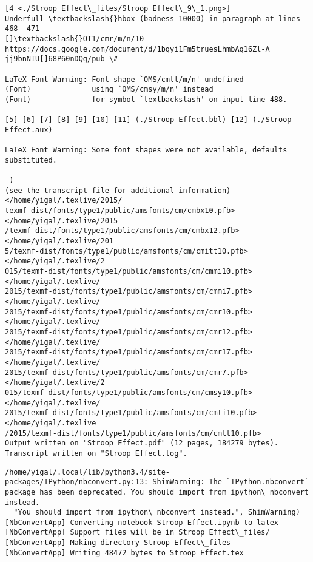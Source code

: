 \documentclass{article}
\begin{document}
\begin{Verbatim}[commandchars=\\\{\}]
[4 <./Stroop Effect\_files/Stroop Effect\_9\_1.png>]
Underfull \textbackslash{}hbox (badness 10000) in paragraph at lines 468--471
[]\textbackslash{}OT1/cmr/m/n/10 https://docs.google.com/document/d/1bqyi1Fm5truesLhmbAq16Zl-A
jj9bnNIU[]68P60nDQg/pub \#

LaTeX Font Warning: Font shape `OMS/cmtt/m/n' undefined
(Font)              using `OMS/cmsy/m/n' instead
(Font)              for symbol `textbackslash' on input line 488.

[5] [6] [7] [8] [9] [10] [11] (./Stroop Effect.bbl) [12] (./Stroop Effect.aux)

LaTeX Font Warning: Some font shapes were not available, defaults substituted.

 )
(see the transcript file for additional information)</home/yigal/.texlive/2015/
texmf-dist/fonts/type1/public/amsfonts/cm/cmbx10.pfb></home/yigal/.texlive/2015
/texmf-dist/fonts/type1/public/amsfonts/cm/cmbx12.pfb></home/yigal/.texlive/201
5/texmf-dist/fonts/type1/public/amsfonts/cm/cmitt10.pfb></home/yigal/.texlive/2
015/texmf-dist/fonts/type1/public/amsfonts/cm/cmmi10.pfb></home/yigal/.texlive/
2015/texmf-dist/fonts/type1/public/amsfonts/cm/cmmi7.pfb></home/yigal/.texlive/
2015/texmf-dist/fonts/type1/public/amsfonts/cm/cmr10.pfb></home/yigal/.texlive/
2015/texmf-dist/fonts/type1/public/amsfonts/cm/cmr12.pfb></home/yigal/.texlive/
2015/texmf-dist/fonts/type1/public/amsfonts/cm/cmr17.pfb></home/yigal/.texlive/
2015/texmf-dist/fonts/type1/public/amsfonts/cm/cmr7.pfb></home/yigal/.texlive/2
015/texmf-dist/fonts/type1/public/amsfonts/cm/cmsy10.pfb></home/yigal/.texlive/
2015/texmf-dist/fonts/type1/public/amsfonts/cm/cmti10.pfb></home/yigal/.texlive
/2015/texmf-dist/fonts/type1/public/amsfonts/cm/cmtt10.pfb>
Output written on "Stroop Effect.pdf" (12 pages, 184279 bytes).
Transcript written on "Stroop Effect.log".
    \end{Verbatim}

    \begin{Verbatim}[commandchars=\\\{\}]
/home/yigal/.local/lib/python3.4/site-packages/IPython/nbconvert.py:13: ShimWarning: The `IPython.nbconvert` package has been deprecated. You should import from ipython\_nbconvert instead.
  "You should import from ipython\_nbconvert instead.", ShimWarning)
[NbConvertApp] Converting notebook Stroop Effect.ipynb to latex
[NbConvertApp] Support files will be in Stroop Effect\_files/
[NbConvertApp] Making directory Stroop Effect\_files
[NbConvertApp] Writing 48472 bytes to Stroop Effect.tex
    \end{Verbatim}
\end{document}
